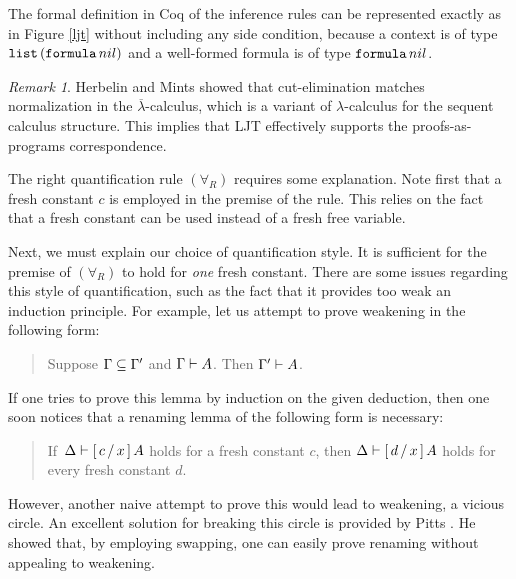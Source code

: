 \documentclass{kms-j}
\theoremstyle{plain}
\theoremstyle{remark}
\newtheorem{rem}[thm]{Remark}
\begin{document}
The formal definition in Coq of the inference rules can be represented
exactly as in Figure \ref{ljt} without including any side condition,
because a context is of type $\tlist\, (\tpfml\, nil)$
and a well-formed formula is of type $\tpfml\, nil$.


\begin{rem}
Herbelin \citep{Herbelin94,HerbelinPhD} and Mints \citep{Mints96} showed that
cut-elimination matches normalization in the $\overline{\lambda}$-calculus,
which is a variant of $\lambda$-calculus for the sequent calculus structure.
This implies that LJT effectively supports the proofs-as-programs correspondence.
\end{rem}

The right quantification rule $(\forall_{R})$ requires some explanation.
Note first that a fresh constant $c$ is employed in the premise of the rule.
This relies on the fact that a fresh constant can be used instead of a fresh free variable.

Next, we must explain our choice of quantification style.
It is sufficient for the premise of $(\forall_R)$ to hold for \textit{one} fresh constant.
There are some issues regarding this style of quantification, such as the fact that
it provides too weak an induction principle.
For example, let us attempt to prove weakening in the following form:

\begin{quotation}
\noindent Suppose $\Ga \tm \Ga'$ and $\Ga \vd A$. Then  $\Ga' \vd A$.
\end{quotation}

If one tries to prove this lemma by induction on the given deduction,
then one soon notices that a renaming lemma of the following form is necessary:

\begin{quotation}
\noindent If\, $\De \vd \substs{A}{x}{c}$ holds for a fresh constant $c$,
then $\De \vd \substs{A}{x}{d}$ holds for every fresh constant $d$.
\end{quotation}
%
However, another naive attempt to prove this would lead to weakening,
 a vicious circle.
An excellent solution for breaking this circle is provided by Pitts \citep{Pitts2003}.
He showed that, by employing swapping, one can easily prove renaming
without appealing to weakening.
\end{document}
